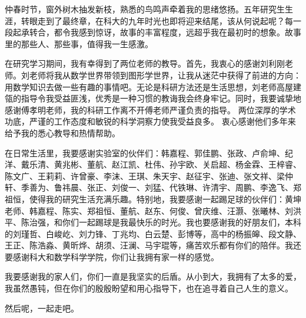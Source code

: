 
\begin{acknowledgements}

仲春时节，窗外树木抽发新枝，熟悉的鸟鸣声牵着我的思绪悠扬。五年研究生生涯，转眼走到了最终章，在科大的九年时光也即将迎来结尾，该从何说起呢？每一段起承转合，都令我感到惊讶，故事的丰富程度，远超乎我在最初时的想象。故事里的那些人、那些事，值得我一生感激。

在研究学习期间，我有幸得到了两位老师的教导。首先，我衷心的感谢刘利刚老师。刘老师将我从数学世界带领到图形学世界，让我从迷茫中获得了前进的方向：用数学知识去做一些有趣的事情吧。无论是科研方法还是生活思想，刘老师高屋建瓴的指导令我受益匪浅，优秀是一种习惯的教诲我会终身牢记。同时，我要诚挚地感谢傅孝明老师，我的科研工作离不开傅老师严谨负责的指导。
两位深厚的学术功底，严谨的工作态度和敏锐的科学洞察力使我受益良多。
衷心感谢他们多年来给予我的悉心教导和热情帮助。

在日常生活里，我要感谢实验室的伙伴们：韩嘉程、郭佳鹏、张政、卢俞坤、纪洋、戴乐清、黄兆彬、董航、赵江凯、杜伟、孙宇欧、关启超、杨金霖、王梓睿、陈文广、王莉莉、许曾豪、李沫、王琪、朱天宇、赵征宇、张迪、张文祥、梁仲轩、季善为、鲁祎晨、张正、刘俊一、刘猛、代铁琳、许清宇、周鹏、李逸飞、郑祖恒，使得我的研究生活充满乐趣。特别地，我要感谢一起踢足球的伙伴们：黄坤老师、韩嘉程、陈实、郑祖恒、董航、赵东、何俊、曾庆维、汪灏、张曦林、刘洪平、陈治强，和你们一起踢球是我最快乐的时光。我也要感谢我的好朋友们，本科的刘瑾哲、白峻屹、刘力锋、丁兆均、白云楚、彭博等，高中的杨振皞、段文静、王正、陈浩淼、黄昕烨、胡须、汪澜、马宇琨等，痛苦欢乐都有你们的陪伴。我还要感谢科大和数学科学学院，你们让我拥有家一样的感觉。

我要感谢我的家人们，你们一直是我坚实的后盾。从小到大，我拥有了太多的爱，我虽然愚钝，但在你们的殷殷盼望和用心指导下，也在追寻着自己人生的意义。

然后呢，一起走吧。


\end{acknowledgements}

